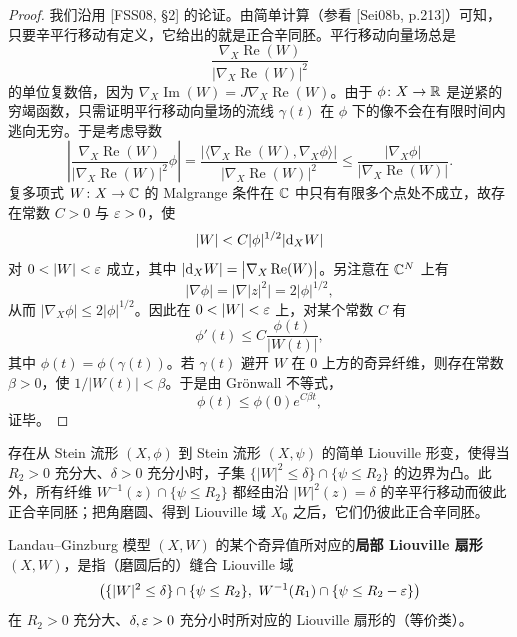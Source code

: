 \begin{proof}
我们沿用 [FSS08, §2] 的论证。由简单计算（参看 [Sei08b, p.213]）可知，只要辛平行移动有定义，它给出的就是正合辛同胚。平行移动向量场总是
\[
\frac{\nabla_X\operatorname{Re}(W)}{\bigl|\nabla_X\operatorname{Re}(W)\bigr|^2}
\]
的单位复数倍，因为 $\nabla_X\operatorname{Im}(W)=J\nabla_X\operatorname{Re}(W)$。由于 $\phi\colon X\to\mathbb{R}$ 是逆紧的穷竭函数，只需证明平行移动向量场的流线 $\gamma(t)$ 在 $\phi$ 下的像不会在有限时间内逃向无穷。于是考虑导数
\[
\left|\frac{\nabla_X\operatorname{Re}(W)}{\bigl|\nabla_X\operatorname{Re}(W)\bigr|^2}\phi\right|
=\frac{\bigl|\langle\nabla_X\operatorname{Re}(W),\nabla_X\phi\rangle\bigr|}
{\bigl|\nabla_X\operatorname{Re}(W)\bigr|^2}
\le\frac{|\nabla_X\phi|}{\bigl|\nabla_X\operatorname{Re}(W)\bigr|}.
\]
复多项式 $W\colon X\to\mathbb{C}$ 的 Malgrange 条件在 $\mathbb{C}$ 中只有有限多个点处不成立，故存在常数 $C>0$ 与 $\varepsilon>0$，使
\[
|W|<C|\phi|^{1/2}|\mathrm{d}_XW|
\]
对 $0<|W|<\eps$ 成立，其中 $|\mathrm{d}_XW|=\bigl|\nabla_X\operatorname{Re}(W)\bigr|$。另注意在 $\mathbb{C}^N$ 上有
\[
|\nabla\phi|=\bigl|\nabla|z|^2\bigr|=2|\phi|^{1/2},
\]
从而 $|\nabla_X\phi|\le2|\phi|^{1/2}$。因此在 $0<|W|<\eps$ 上，对某个常数 $C$ 有
\[
\phi'(t)\le C\frac{\phi(t)}{|W(t)|},
\]
其中 $\phi(t)=\phi(\gamma(t))$。若 $\gamma(t)$ 避开 $W$ 在 $0$ 上方的奇异纤维，则存在常数 $\beta>0$，使 $1/|W(t)|<\beta$。于是由 Gr{\"o}nwall 不等式，
\[
\phi(t)\le\phi(0)e^{C\beta t},
\]
证毕。
\end{proof}

\begin{proposition}\label{prop:local-convex-boundary}\label{prop:2-2-3}
存在从 Stein 流形 $(X,\phi)$ 到 Stein 流形 $(X,\psi)$ 的简单 Liouville 形变，使得当 $R_2>0$ 充分大、$\delta>0$ 充分小时，子集 $\{|W|^2\le\delta\}\cap\{\psi\le R_2\}$ 的边界为凸。此外，所有纤维 $W^{-1}(z)\cap\{\psi\le R_2\}$ 都经由沿 $|W|^2(z)=\delta$ 的辛平行移动而彼此正合辛同胚；把角磨圆、得到 Liouville 域 $X_0$ 之后，它们仍彼此正合辛同胚。
\end{proposition}

\begin{definition}\label{def:local-sector}\label{def:2-2-4}
Landau--Ginzburg 模型 $(X,W)$ 的某个奇异值所对应的\textbf{局部 Liouville 扇形} $(X,W)$，是指（磨圆后的）缝合 Liouville 域
\[
\bigl(\{|W|^2\le\delta\}\cap\{\psi\le R_2\},\ W^{-1}(R_1)\cap\{\psi\le R_2-\eps\}\bigr)
\]
在 $R_2>0$ 充分大、$\delta,\varepsilon>0$ 充分小时所对应的 Liouville 扇形的（等价类）。
\end{definition}


